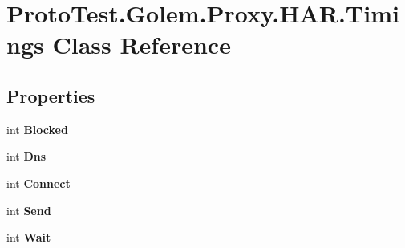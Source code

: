 \hypertarget{class_proto_test_1_1_golem_1_1_proxy_1_1_h_a_r_1_1_timings}{\section{Proto\-Test.\-Golem.\-Proxy.\-H\-A\-R.\-Timings Class Reference}
\label{class_proto_test_1_1_golem_1_1_proxy_1_1_h_a_r_1_1_timings}
}
\subsection*{Properties}
\begin{DoxyCompactItemize}
\item 
\hypertarget{class_proto_test_1_1_golem_1_1_proxy_1_1_h_a_r_1_1_timings_ac223d3c92210f8e4fc9c3de7e9a5f6f3}{int {\bfseries Blocked}}\label{class_proto_test_1_1_golem_1_1_proxy_1_1_h_a_r_1_1_timings_ac223d3c92210f8e4fc9c3de7e9a5f6f3}

\item 
\hypertarget{class_proto_test_1_1_golem_1_1_proxy_1_1_h_a_r_1_1_timings_a8f9cd9f62dbf5271f012aec743c0f66a}{int {\bfseries Dns}}\label{class_proto_test_1_1_golem_1_1_proxy_1_1_h_a_r_1_1_timings_a8f9cd9f62dbf5271f012aec743c0f66a}

\item 
\hypertarget{class_proto_test_1_1_golem_1_1_proxy_1_1_h_a_r_1_1_timings_ad097cc53a463a399bd1b2187aefb6c5d}{int {\bfseries Connect}}\label{class_proto_test_1_1_golem_1_1_proxy_1_1_h_a_r_1_1_timings_ad097cc53a463a399bd1b2187aefb6c5d}

\item 
\hypertarget{class_proto_test_1_1_golem_1_1_proxy_1_1_h_a_r_1_1_timings_a9778ab37bc3f91ab43e97daa9fb95d7e}{int {\bfseries Send}}\label{class_proto_test_1_1_golem_1_1_proxy_1_1_h_a_r_1_1_timings_a9778ab37bc3f91ab43e97daa9fb95d7e}

\item 
\hypertarget{class_proto_test_1_1_golem_1_1_proxy_1_1_h_a_r_1_1_timings_a0ad13de54ee461e264811c2b0bb71548}{int {\bfseries Wait}}\label{class_proto_test_1_1_golem_1_1_proxy_1_1_h_a_r_1_1_timings_a0ad13de54ee461e264811c2b0bb71548}


\end{DoxyCompactItemize}
